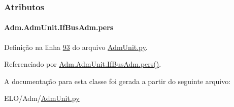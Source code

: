 \subsubsection{Atributos}
\hypertarget{classAdm_1_1AdmUnit_1_1IfBusAdm_a95ea8f39fbbcddf44822e1614c712bfe}{
\paragraph[{pers}]{\setlength{\rightskip}{0pt plus 5cm}Adm.\-Adm\-Unit.\-If\-Bus\-Adm.\-pers}}\label{classAdm_1_1AdmUnit_1_1IfBusAdm_a95ea8f39fbbcddf44822e1614c712bfe}


Definição na linha \hyperlink{AdmUnit_8py_source_l00093}{93} do arquivo \hyperlink{AdmUnit_8py_source}{Adm\-Unit.\-py}.



Referenciado por \hyperlink{classAdm_1_1AdmUnit_1_1IfBusAdm_a31857b146085382c8d778ae90cd46c6f}{Adm.\-Adm\-Unit.\-If\-Bus\-Adm.\-pers()}.



A documentação para esta classe foi gerada a partir do seguinte arquivo\-:\begin{DoxyCompactItemize}
\item 
E\-L\-O/\-Adm/\hyperlink{AdmUnit_8py}{Adm\-Unit.\-py}\end{DoxyCompactItemize}
